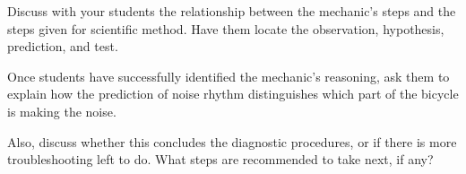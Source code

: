 
Discuss with your students the relationship between the mechanic's steps and the steps given for scientific method.  Have them locate the observation, hypothesis, prediction, and test.

Once students have successfully identified the mechanic's reasoning, ask them to explain how the prediction of noise rhythm distinguishes which part of the bicycle is making the noise.

Also, discuss whether this concludes the diagnostic procedures, or if there is more troubleshooting left to do.  What steps are recommended to take next, if any?




